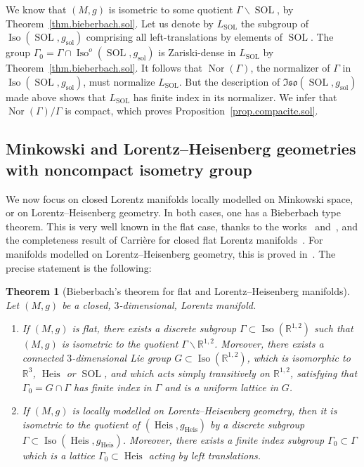 \documentclass[11pt]{article}
\newtheorem{theo}{Theorem}[section]
\theoremstyle{definition}
\numberwithin{equation}{section}
\numberwithin{figure}{section}
\numberwithin{table}{section}
\DeclareMathOperator{\Iso}{Iso}
\DeclareMathOperator{\Nor}{Nor}
\DeclareMathOperator{\Sol}{SOL}
\DeclareMathOperator{\sol}{sol}
\DeclareMathOperator{\Heis}{Heis}
\DeclareMathOperator{\SOL}{SOL}
\newcommand*\RR{\mathbb{R}}
\begin{document}
We know that $(M,g)$ is isometric to some quotient $\Gamma \backslash \Sol$, by Theorem~\ref{thm.bieberbach.sol}. Let us denote by $L_{\SOL}$ the subgroup of $\Iso(\Sol,g_{\sol})$ comprising all left-translations by elements of $\Sol$. The group $\Gamma_0=\Gamma \cap \Iso^o(\Sol,g_{\sol})$ is Zariski-dense in $L_{\SOL}$ by Theorem~\ref{thm.bieberbach.sol}. It follows that $\Nor(\Gamma)$, the normalizer of $\Gamma$ in $\Iso(\Sol,g_{\sol})$, must normalize $L_{\SOL}$. But the description of $\mathfrak{Iso}(\Sol,g_{\sol})$ made above shows that $L_{\SOL}$ has finite index in its normalizer. We infer that $\Nor(\Gamma)/\Gamma$ is compact, which proves Proposition~\ref{prop.compacite.sol}.


\subsection{Minkowski and Lorentz--Heisenberg geometries with noncompact isometry group}\label{sec.minkowski}
We now focus on closed Lorentz manifolds locally modelled on Minkowski space, or on Lorentz--Heisenberg geometry. In both cases, one has a Bieberbach type theorem. This is very well known in the flat case, thanks to the works~\cite{fried.goldman} and~\cite{goldman.kami}, and the completeness result of Carrière for closed flat Lorentz manifolds~\cite{carriere}. For manifolds modelled on Lorentz--Heisenberg geometry, this is proved in~\cite[Proposition~8.1]{sorin.ghani}. The precise statement is the following:

\begin{theo}[Bieberbach's theorem for flat and Lorentz--Heisenberg manifolds]\label{thm.bieberbach.minkowski}
Let $(M,g)$ be a closed, $3$-dimensional, Lorentz manifold.
\begin{enumerate}
\item \label{list4.5.1}If $(M,g)$ is flat, there exists a discrete subgroup $\Gamma \subset \Iso(\RR^{1,2})$ such that $(M,g)$ is isometric to the quotient $\Gamma \backslash \RR^{1,2}$. Moreover, there exists a connected $3$-dimensional Lie group $G \subset \Iso(\RR^{1,2})$, which is isomorphic to $\RR^3$, $\Heis$ or $\Sol$, and which acts simply transitively on $\RR^{1,2}$, satisfying that $\Gamma_0=G \cap \Gamma$ has finite index in $\Gamma$ and is a uniform lattice in $G$.
\item \label{list4.5.2}If $(M,g)$ is locally modelled on Lorentz--Heisenberg geometry, then it is isometric to the quotient of $(\Heis,g_{\Heis})$ by a discrete subgroup $\Gamma \subset \Iso(\Heis,g_{\Heis})$. Moreover, there exists a finite index subgroup $\Gamma_0 \subset \Gamma$ which is a lattice $\Gamma_0 \subset \Heis$ acting by left translations.
\end{enumerate}
\end{theo}
\end{document}
